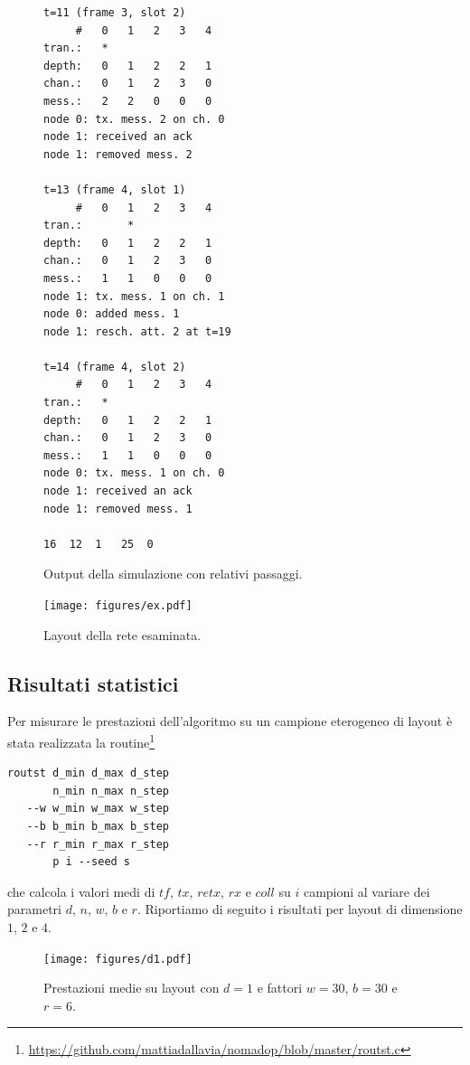 \documentclass[a4paper,12pt]{article}
\theoremstyle{definition}
\begin{document}
\begin{figure}[H]
\begin{multicols}{3}
\begin{Verbatim}[fontsize=\scriptsize,tabsize=2]
t=11 (frame 3, slot 2)
     #   0   1   2   3   4 
tran.:   *                 
depth:   0   1   2   2   1 
chan.:   0   1   2   3   0 
mess.:   2   2   0   0   0 
node 0: tx. mess. 2 on ch. 0
node 1: received an ack
node 1: removed mess. 2

t=13 (frame 4, slot 1)
     #   0   1   2   3   4 
tran.:       *             
depth:   0   1   2   2   1 
chan.:   0   1   2   3   0 
mess.:   1   1   0   0   0 
node 1: tx. mess. 1 on ch. 1
node 0: added mess. 1
node 1: resch. att. 2 at t=19

t=14 (frame 4, slot 2)
     #   0   1   2   3   4 
tran.:   *                 
depth:   0   1   2   2   1 
chan.:   0   1   2   3   0 
mess.:   1   1   0   0   0 
node 0: tx. mess. 1 on ch. 0
node 1: received an ack
node 1: removed mess. 1

16	12	1	25	0
\end{Verbatim}
\end{multicols}
\caption{Output della simulazione con relativi passaggi.}
\end{figure}


\begin{figure}[H]
\centering
\texttt{[image: figures/ex.pdf]}
\caption{Layout della rete esaminata.}
\end{figure}

\subsection{Risultati statistici}

Per misurare le prestazioni dell'algoritmo su un campione eterogeneo di layout è stata realizzata la routine\footnote{\url{https://github.com/mattiadallavia/nomadop/blob/master/routst.c}}

{\centering
\begin{BVerbatim}
routst d_min d_max d_step
       n_min n_max n_step
   --w w_min w_max w_step
   --b b_min b_max b_step
   --r r_min r_max r_step
       p i --seed s
\end{BVerbatim}

}

che calcola i valori medi di $tf$, $tx$, $retx$, $rx$ e $coll$ su $i$ campioni al variare dei parametri $d$, $n$, $w$, $b$ e $r$. Riportiamo di seguito i risultati per layout di dimensione $1$, $2$ e $4$.

\begin{figure}[H]
\centering
\texttt{[image: figures/d1.pdf]}
\caption{Prestazioni medie su layout con $d=1$ e fattori $w=30$, $b=30$ e $r=6$.}
\end{figure}
\end{document}

